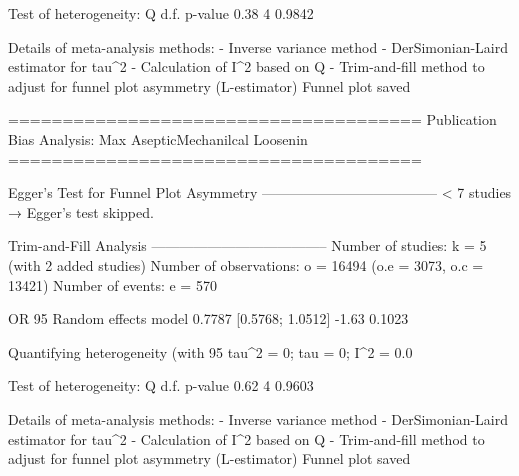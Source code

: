 Test of heterogeneity:
    Q d.f. p-value
 0.38    4  0.9842

Details of meta-analysis methods:
- Inverse variance method
- DerSimonian-Laird estimator for tau^2
- Calculation of I^2 based on Q
- Trim-and-fill method to adjust for funnel plot asymmetry (L-estimator)
  Funnel plot saved

======================================
Publication Bias Analysis: Max AsepticMechanilcal Loosenin 
======================================
                                                                                                                                                          
Egger's Test for Funnel Plot Asymmetry
--------------------------------------
  < 7 studies → Egger’s test skipped.

Trim-and-Fill Analysis
--------------------------------------
Number of studies: k = 5 (with 2 added studies)
Number of observations: o = 16494 (o.e = 3073, o.c = 13421)
Number of events: e = 570

                         OR           95%
Random effects model 0.7787 [0.5768; 1.0512] -1.63  0.1023

Quantifying heterogeneity (with 95%
 tau^2 = 0; tau = 0; I^2 = 0.0%

Test of heterogeneity:
    Q d.f. p-value
 0.62    4  0.9603

Details of meta-analysis methods:
- Inverse variance method
- DerSimonian-Laird estimator for tau^2
- Calculation of I^2 based on Q
- Trim-and-fill method to adjust for funnel plot asymmetry (L-estimator)
  Funnel plot saved